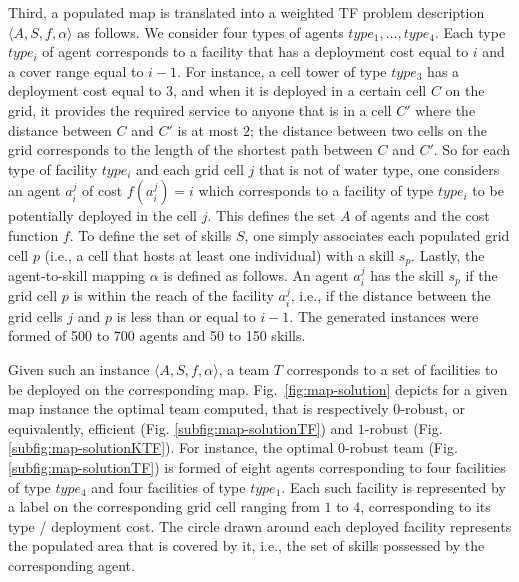 \documentclass[conference]{IEEEtran}
\theoremstyle{definition}
\begin{document}
Third, a populated map is translated into a weighted TF problem description
 $\langle A, S, f, \alpha\rangle$ as follows.
We consider four types of agents $type_1, \ldots, type_4$. 
Each type $type_i$ of agent corresponds to a facility that has a deployment cost
equal to $i$ and a cover range equal to $i - 1$. For instance, a cell tower 
of type $type_3$ has a deployment cost equal to $3$, and when it is
deployed in a certain cell $C$ on the grid, it provides the required service 
to anyone that is in a cell $C'$ where the distance between
$C$ and $C'$ is at most $2$; the distance between two cells on the grid corresponds 
to the length of the shortest path
between $C$ and $C'$. So for each type of facility $type_i$ and each grid cell $j$ that is not of water type,
one considers an agent $a_i^j$ of cost $f(a_i^j) = i$ which corresponds to a 
facility of type $type_i$ to be potentially deployed in the cell $j$.
This defines the set $A$ of agents and the cost function $f$.
To define the set of skills $S$,
one simply associates each populated grid cell $p$ 
(i.e., a cell that hosts at least one individual) with a skill $s_p$.
Lastly, the agent-to-skill mapping $\alpha$ is defined as follows. An agent $a_i^j$ 
has the skill $s_p$ if the grid cell $p$ is within the reach of the facility $a_i^j$, 
i.e., if the distance between the grid cells $j$ and $p$ is less than or equal to $i - 1$.
The generated instances were formed of 500 to 700 agents and 50 to 150 skills.


Given such an instance $\langle A, S, f, \alpha\rangle$, a team $T$ 
corresponds to a set of facilities to be deployed on the corresponding map.
Fig.~\ref{fig:map-solution} depicts for a given map instance the optimal team computed, that is
respectively $0$-robust, or equivalently, efficient (Fig. \ref{subfig:map-solutionTF}) and $1$-robust (Fig. \ref{subfig:map-solutionKTF}).
For instance, the optimal $0$-robust team (Fig. \ref{subfig:map-solutionTF}) 
is formed of eight agents corresponding to four facilities
of type $type_4$ and four facilities of type $type_1$. Each such facility 
is represented by a label on the corresponding grid cell
ranging from $1$ to $4$, corresponding to its type / deployment cost. 
The circle drawn around each deployed facility represents the populated area
that is covered by it, i.e., the set of skills possessed by the corresponding agent.
\end{document}
